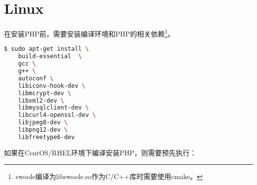 \section{Linux}


在安装PHP前，需要安装编译环境和PHP的相关依赖\footnote{swoole编译为libswoole.so作为C/C++库时需要使用cmake。}。



\begin{lstlisting}[language=bash]
$ sudo apt-get install \
	build-essential  \
	gcc \
	g++ \
	autoconf \
	libiconv-hook-dev \
	libmcrypt-dev \
	libxml2-dev \
	libmysqlclient-dev \
	libcurl4-openssl-dev \
	libjpeg8-dev \
	libpng12-dev \
	libfreetype6-dev
\end{lstlisting}

如果在CentOS/RHEL环境下编译安装PHP，则需要预先执行：


